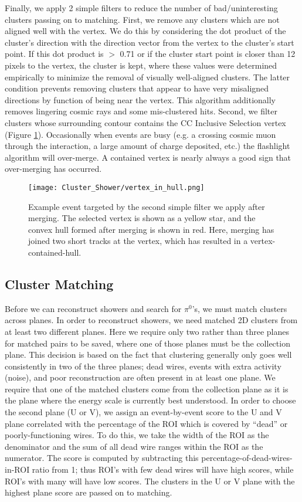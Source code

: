 \par Finally, we apply 2 simple filters to reduce the number of bad/uninteresting clusters passing on to matching. First, we remove any clusters which are not aligned well with the vertex.  We do this by considering the dot product of the cluster's direction with the direction vector from the vertex to the cluster's start point.  If this dot product is $>$ 0.71 or if the cluster start point is closer than 12 pixels to the vertex, the cluster is kept, where these values were determined empirically to minimize the removal of visually well-aligned clusters.  The latter condition prevents removing clusters that appear to have very misaligned directions by function of being near the vertex. This algorithm additionally removes lingering cosmic rays and some mis-clustered hits. Second, we filter clusters whose surrounding contour contains the CC Inclusive Selection vertex (Figure \ref{fig:vertex_in_hull}). Occasionally when events are busy (e.g. a crossing cosmic muon through the interaction, a large amount of charge deposited, etc.) the flashlight algorithm will over-merge. A contained vertex is nearly always a good sign that over-merging has occurred.  

\begin{figure}[H]
\centering
\texttt{[image: Cluster\_Shower/vertex\_in\_hull.png]}
\caption{Example event targeted by the second simple filter we apply after merging. The selected vertex is shown as a yellow star, and the convex hull formed after merging is shown in red. Here, merging has joined two short tracks at the vertex, which has resulted in a vertex-contained-hull. }
\label{fig:vertex_in_hull}
\end{figure}


\subsection{Cluster Matching}
Before we can reconstruct showers and search for $\pi^{0}$'s, we must match clusters across planes.  In order to reconstruct showers, we need matched 2D clusters from at least two different planes. Here we require only two rather than three planes for matched pairs to be saved, where one of those planes must be the collection plane. This decision is based on the fact that clustering generally only goes well consistently in two of the three planes; dead wires, events with extra activity (noise), and poor reconstruction are often present in at least one plane. We require that one of the matched clusters come from the collection plane as it is the plane where the energy scale is currently best understood.  In order to choose the second plane (U or V), we assign an event-by-event score to the U and V plane correlated with the percentage of the ROI which is covered by ``dead'' or poorly-functioning wires.  
 To do this, we take the width of the ROI as the denominator and the sum of all dead wire ranges within the ROI as the numerator. The score is computed by subtracting this percentage-of-dead-wires-in-ROI ratio from 1; thus ROI's with few dead wires will have high scores, while ROI's with many will have low scores.  The clusters in the U or V plane with the highest plane score are passed on to matching. 


